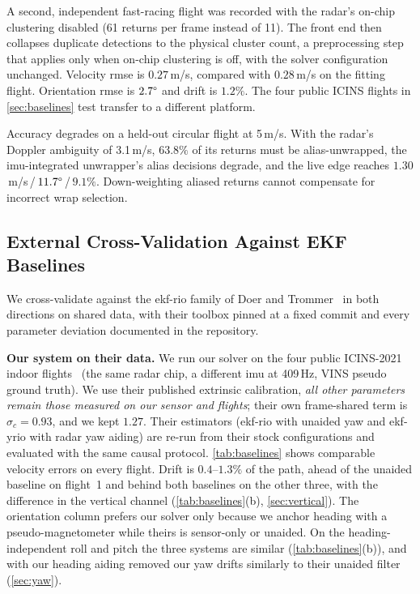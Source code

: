 A second, independent fast-racing flight was recorded with the radar's
on-chip clustering disabled (61 returns per frame instead of 11).  The
front end then collapses duplicate detections to the physical cluster
count, a preprocessing step that applies only when on-chip clustering
is off, with the solver configuration unchanged.  Velocity \ac{rmse}
is $0.27$\,m/s, compared with $0.28$\,m/s on the fitting flight.
Orientation \ac{rmse} is $2.7\degree$ and drift is $1.2\%$.
The four public ICINS flights in \autoref{sec:baselines} test
transfer to a different platform.

Accuracy degrades on a held-out circular flight at 5\,m/s.
With the radar's Doppler ambiguity of 3.1\,m/s, $63.8\%$ of its
returns must be
alias-unwrapped, the \ac{imu}-integrated unwrapper's alias decisions
degrade, and the live edge reaches
$1.30$\,m/s\,/\,$11.7\degree$\,/\,$9.1\%$.
Down-weighting aliased returns cannot compensate for incorrect wrap selection.



\subsection{External Cross-Validation Against EKF Baselines}
\label{sec:baselines}
We cross-validate against the \ac{ekf}-\ac{rio} family of Doer and
Trommer~\cite{doer2020ekf,doer2021yrio} in both directions on shared
data, with their toolbox pinned at a fixed commit and every parameter
deviation documented in the repository.

\textbf{Our system on their data.}  We run our solver on the four public ICINS-2021 indoor flights~\cite{doer2021yrio} (the same radar chip, a different \ac{imu}
at 409\,Hz, VINS pseudo ground truth). We use their published extrinsic
calibration, \emph{all other parameters remain those measured on our sensor and flights}; their own frame-shared term is $\sigma_c = 0.93$, and we kept
$1.27$.  Their
estimators (\mbox{ekf-rio} with unaided yaw and \mbox{ekf-yrio} with
radar yaw aiding) are re-run from their stock configurations and evaluated with
the same causal protocol.  \autoref{tab:baselines} shows comparable velocity errors on every flight.
Drift is $0.4$--$1.3\%$ of the path, ahead of the unaided baseline on
flight~1 and behind both baselines on the other three, with the
difference in the vertical channel (\autoref{tab:baselines}(b),
\autoref{sec:vertical}).  The
orientation column prefers our solver only because we anchor heading 
 with a pseudo-magnetometer while theirs is sensor-only or
unaided. On the heading-independent roll and pitch the three systems are
similar (\autoref{tab:baselines}(b)), and with our heading aiding
removed our yaw drifts similarly to their unaided filter
(\autoref{sec:yaw}).

